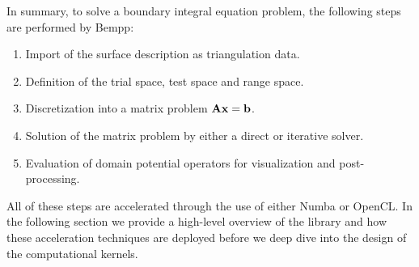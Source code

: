 In summary, to solve a boundary integral equation problem, the following steps are performed by Bempp:
\begin{enumerate}
	\item Import of the surface description as triangulation data.
	\item Definition of the trial space, test space and range space.
	\item Discretization into a matrix problem $\mathbf{A}\mathbf{x}=\mathbf{b}$.
	\item Solution of the matrix problem by either a direct or iterative solver.
	\item Evaluation of domain potential operators for visualization and post-processing.
\end{enumerate}

All of these steps are accelerated through the use of either Numba or OpenCL. In the following section we provide a high-level overview of the library and how these acceleration techniques are deployed before we deep dive into the design of the computational kernels.
